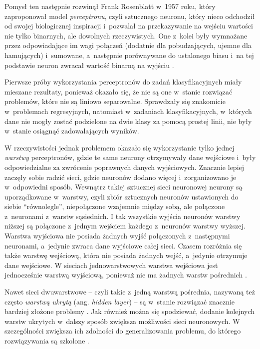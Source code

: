 Pomysł ten następnie rozwinął Frank Rosenblatt w~1957 roku, który zaproponował model \emph{perceptronu}, czyli sztucznego neuronu, który nieco odchodził od swojej biologicznej inspiracji i~pozwalał na przekazywanie na wejściu wartości nie tylko binarnych, ale dowolnych rzeczywistych.
One z~kolei były wymnażane przez odpowiadające im wagi połączeń (dodatnie dla pobudzających, ujemne dla hamujących) i~sumowane, a~następnie porównywane do ustalonego biasu i~na tej podstawie neuron zwracał wartość binarną na wyjściu \cite{rosenbaltt1957perceptron}.

Pierwsze próby wykorzystania perceptronów do zadań klasyfikacyjnych miały mieszane rezultaty, ponieważ okazało się, że nie są one w~stanie rozwiązać problemów, które nie są liniowo separowalne.
Sprawdzały się znakomicie w~problemach regresyjnych, natomiast w~zadaniach klasyfikacyjnych, w~których dane nie mogły zostać podzielone na dwie klasy za pomocą prostej linii, nie były w~stanie osiągnąć zadowalających wyników.

W rzeczywistości jednak problemem okazało się wykorzystanie tylko jednej \emph{warstwy} perceptronów, gdzie te same neurony otrzymywały dane wejściowe i~były odpowiedzialne za zwrócenie poprawnych danych wyjściowych.
Znacznie lepiej zaczęły sobie radzić sieci, gdzie neuronów dodano więcej i~zorganizowano je w~odpowiedni sposób.
Wewnątrz takiej sztucznej sieci neuronowej neurony są uporządkowane w~warstwy, czyli zbiór sztucznych neuronów ustawionych do siebie ``równolegle'', niepołączone wzajemnie między sobą, ale połączone z~neuronami z~warstw sąsiednich.
I tak wszystkie wyjścia neuronów warstwy niższej są połączone z~jednym wejściem każdego z~neuronów warstwy wyższej.
Warstwa wyjściowa nie posiada żadnych wyjść połączonych z~następnymi neuronami, a~jedynie zwraca dane wyjściowe całej sieci.
Czasem rozróżnia się także warstwę wejściową, która nie posiada żadnych wejść, a~jedynie otrzymuje dane wejściowe.
W sieciach jednowarstwowych warstwa wejściowa jest jednocześnie warstwą wyjściową, ponieważ nie ma żadnych warstw pośrednich \cite{bishop1994neural}.

Nawet sieci dwuwarstwowe -- czyli takie z~jedną warstwą pośrednia, nazywaną też często \emph{warstwą ukrytą} (ang. \emph{hidden layer}) -- są w~stanie rozwiązać znacznie bardziej złożone problemy \cite{huang2000classification}.
Jak również można się spodziewać, dodanie kolejnych warstw ukrytych w~dalszy sposób zwiększa możliwości sieci neuronowych.
W szczególności zwiększa ich zdolności do generalizowania problemu, do którego rozwiązywania są szkolone \cite{thomas2017two}.

